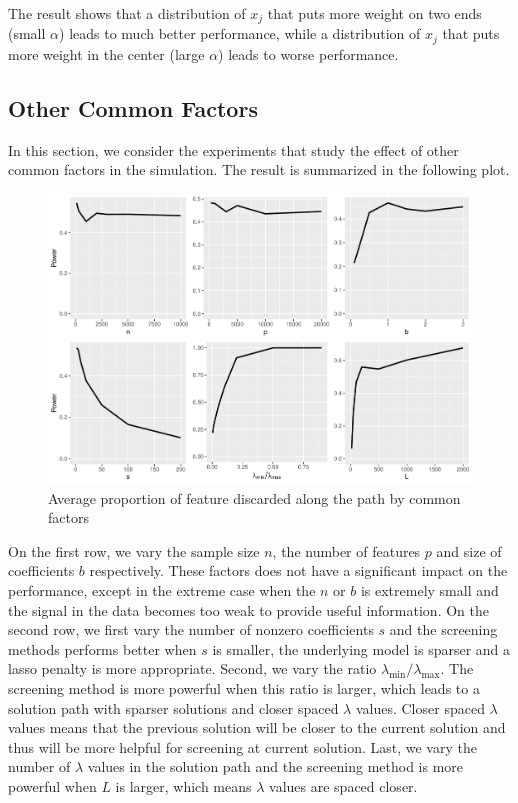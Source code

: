 The result shows that a distribution of $x_j$ that puts more weight on two ends (small $\alpha$) leads to much better performance, while a distribution of $x_j$ that puts more weight in the center (large $\alpha$) leads to worse performance.

\subsection{Other Common Factors}

In this section, we consider the experiments that study the effect of other common factors in the simulation. The result is summarized in the following plot.

\begin{figure}[ht]
    \centering
    \includegraphics[width=\textwidth]{coxsim.pdf}    
    \caption{Average proportion of feature discarded along the path by common factors}
\end{figure}

On the first row, we vary the sample size $n$, the number of features $p$ and size of coefficients $b$ respectively. These factors does not have a significant impact on the performance, except in the extreme case when the $n$ or $b$ is extremely small and the signal in the data becomes too weak to provide useful information. On the second row, we first vary the number of nonzero coefficients $s$ and the screening methods performs better when $s$ is smaller, the underlying model is sparser and a lasso penalty is more appropriate. Second, we vary the ratio $\lambda_{\min}/\lambda_{\max}$. The screening method is more powerful when this ratio is larger, which leads to a solution path with sparser solutions and closer spaced $\lambda$ values. Closer spaced $\lambda$ values means that the previous solution will be closer to the current solution and thus will be more helpful for screening at current solution. Last, we vary the number of $\lambda$ values in the solution path and the screening method is more powerful when $L$ is larger, which means $\lambda$ values are spaced closer.  

